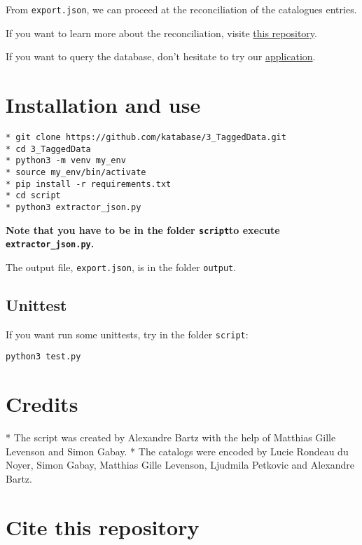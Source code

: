 From \texttt{export.json}, we can proceed at the reconciliation of the catalogues entries. 

If you want to learn more about the reconciliation, visite \href{https://raw.github.com/katabase/reconciliation}{this repository}. 

If you want to query the database, don't hesitate to try our \href{https://raw.github.com/katabase/application}{application}.
\section*{Installation and use}

\begin{listing}[h!]
   \begin{verbatim}
* git clone https://github.com/katabase/3_TaggedData.git
* cd 3_TaggedData
* python3 -m venv my_env
* source my_env/bin/activate
* pip install -r requirements.txt
* cd script 
* python3 extractor_json.py

   \end{verbatim}
\end{listing}
\textbf{Note that you have to be in the folder \texttt{script}to execute \texttt{extractor\_json.py}.}

The output file, \texttt{export.json}, is in the folder \texttt{output}.
\subsection*{Unittest}

If you want run some unittests, try in the folder \texttt{script}: 

\begin{listing}[h!]
   \begin{verbatim}
python3 test.py

   \end{verbatim}
\end{listing}
\section*{Credits}

* The script was created by Alexandre Bartz with the help of Matthias Gille Levenson and Simon Gabay.
* The catalogs were encoded by Lucie Rondeau du Noyer, Simon Gabay, Matthias Gille Levenson, Ljudmila Petkovic and Alexandre Bartz.
\section*{Cite this repository}

